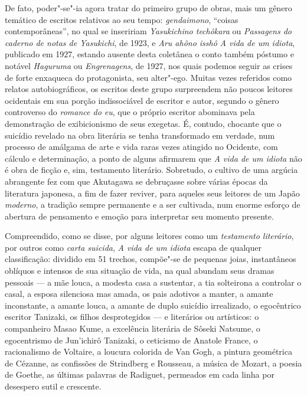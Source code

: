 De fato, poder"-se"-ia agora tratar do primeiro grupo de obras, mais um 
gênero temático de escritos relativos ao seu tempo: \textit{gendaimono}, ``coisas contemporâneas'', no qual se inseririam
\textit{Yasukichino techôkara} ou \textit{Passagens do caderno de notas de Yasukichi}, de 
1923, e \textit{Aru ahôno isshô} \textit{A vida de um idiota}, publicado em 1927, 
estando ausente desta coletânea o conto também póstumo e notável \textit{Haguruma} ou \textit{Engrenagens}, de 1927, nos quais podemos seguir as crises de
forte enxaqueca do protagonista, seu alter"-ego. Muitas vezes referidos como
relatos autobiográficos, os escritos deste grupo surpreendem não poucos
leitores ocidentais em sua porção indissociável de escritor e autor,
segundo o gênero controverso do \textit{romance do eu}, que o próprio
escritor abominava pela demonstração de exibicionismo de seus exegetas.
 É, contudo, chocante que o suicídio revelado na obra literária se
tenha transformado em verdade, num processo de amálgama de arte e vida
raras vezes atingido no Ocidente, com cálculo e determinação, a ponto
de alguns afirmarem que \textit{A vida de um idiota} não é obra de ficção e,
sim, testamento literário. Sobretudo, o cultivo de uma argúcia
abrangente fez com que Akutagawa se debruçasse sobre várias épocas da
literatura japonesa, a fim de fazer reviver, para aqueles seus leitores
de um Japão \textit{moderno}, a tradição sempre permanente e a ser cultivada,
num enorme esforço de abertura de pensamento e emoção para interpretar
seu momento presente.

Compreendido, como se disse, por alguns leitores como um \textit{testamento
literário}, por outros como \textit{carta suicida}, \textit{A vida de um idiota} 
escapa de qualquer classificação: dividido em 51 trechos, compõe"-se de
pequenas joias, instantâneos oblíquos e intensos de sua situação de
vida, na qual abundam seus dramas pessoais --- a mãe louca, a modesta casa
a sustentar, a tia solteirona a controlar o casal, a esposa silenciosa
mas amada, os pais adotivos a manter, a amante inconstante, a amante
louca, a amante de duplo suicídio irrealizado, o egocêntrico escritor
Tanizaki, os filhos desprotegidos --- e literários ou artísticos: o
companheiro Masao Kume, a excelência literária de Sôseki Natsume, o
egocentrismo de Jun'ichirô Tanizaki, o ceticismo de Anatole France, o
racionalismo de Voltaire, a loucura colorida de Van Gogh, a pintura
geométrica de Cézanne, as confissões de Strindberg e Rousseau, a música
de Mozart, a poesia de Goethe, as últimas palavras de Radiguet,
permeados em cada linha por desespero sutil e crescente.

